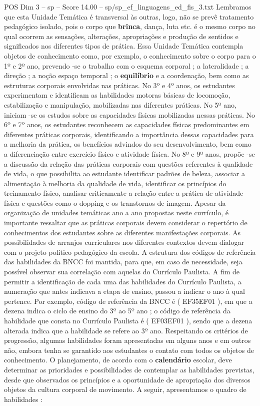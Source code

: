 \begin{textsample}{POS Dim 3 – sp – Score 14.00 – sp/sp\_ef\_linguagens\_ed\_fis\_3.txt}
Lembramos que esta Unidade Temática é transversal às outras, logo, não se prevê tratamento pedagógico isolado, pois o corpo que \textbf{brinca}, dança, luta etc. é o mesmo corpo no qual ocorrem as sensações, alterações, apropriações e produção de sentidos e significados nos diferentes tipos de prática.
Essa Unidade Temática contempla objetos de conhecimento como, por exemplo, o conhecimento sobre o corpo para o 1º e 2º ano, prevendo -se o trabalho com o esquema corporal ; a lateralidade ; a direção ; a noção espaço temporal ; o \textbf{equilíbrio} e a coordenação, bem como as estruturas corporais envolvidas nas práticas.
No 3º e 4º anos, os estudantes experimentam e identificam as habilidades motoras básicas de locomoção, estabilização e manipulação, mobilizadas nas diferentes práticas.
No 5º ano, iniciam -se os estudos sobre as capacidades físicas mobilizadas nessas práticas.
No 6º e 7º anos, os estudantes reconhecem as capacidades físicas predominantes em diferentes práticas corporais, identificando a importância dessas capacidades para a melhoria da prática, os benefícios advindos do seu desenvolvimento, bem como a diferenciação entre exercício físico e atividade física.
No 8º e 9º anos, propõe -se a discussão da relação das práticas corporais com questões referentes à qualidade de vida, o que possibilita ao estudante identificar padrões de beleza, associar a alimentação à melhoria da qualidade de vida, identificar os princípios do treinamento físico, analisar criticamente a relação entre a prática de atividade física e questões como o dopping e os transtornos de imagem.
Apesar da organização de unidades temáticas ano a ano propostas neste currículo, é importante ressaltar que as práticas corporais devem considerar o repertório de conhecimentos dos estudantes sobre as diferentes manifestações corporais.
As possibilidades de arranjos curriculares nos diferentes contextos devem dialogar com o projeto político pedagógico da escola.
A estrutura dos códigos de referência das habilidades da BNCC foi mantida, para que, em caso de necessidade, seja possível observar sua correlação com aquelas do Currículo Paulista.
A fim de permitir a identificação de cada uma das habilidades do Currículo Paulista, a numeração que antes indicava a etapa de ensino, passou a indicar o ano à qual pertence.
Por exemplo, código de referência da BNCC é ( EF35EF01 ), em que a dezena indica o ciclo de ensino do 3º ao 5º ano ; o código de referência da habilidade que consta no Currículo Paulista é ( EF03EF01 ), sendo que a dezena alterada indica que a habilidade se refere ao 3º ano.
Respeitando os critérios de progressão, algumas habilidades foram apresentadas em alguns anos e em outros não, embora tenha se garantido aos estudantes o contato com todos os objetos de conhecimento.
O planejamento, de acordo com o \textbf{calendário} escolar, deve determinar as prioridades e possibilidades de contemplar as habilidades previstas, desde que observados os princípios e a oportunidade de apropriação dos diversos objetos da cultura corporal de movimento.
A seguir, apresentamos o quadro de habilidades :

\end{textsample}
